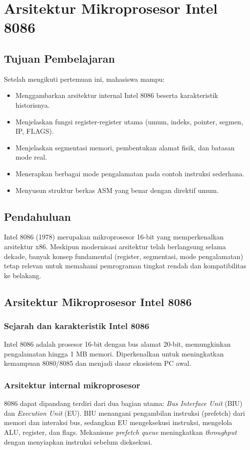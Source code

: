 \chapter{Arsitektur Mikroprosesor Intel 8086}

\section{Tujuan Pembelajaran}
Setelah mengikuti pertemuan ini, mahasiswa mampu:
\begin{itemize}
    \item Menggambarkan arsitektur internal Intel 8086 beserta karakteristik historisnya.
    \item Menjelaskan fungsi register-register utama (umum, indeks, pointer, segmen, IP, FLAGS).
    \item Menjelaskan segmentasi memori, pembentukan alamat fisik, dan batasan mode real.
    \item Menerapkan berbagai mode pengalamatan pada contoh instruksi sederhana.
    \item Menyusun struktur berkas ASM yang benar dengan direktif umum.
\end{itemize}

\section{Pendahuluan}
Intel 8086 (1978) merupakan mikroprosesor 16-bit yang memperkenalkan arsitektur x86. Meskipun modernisasi arsitektur telah berlangsung selama dekade, banyak konsep fundamental (register, segmentasi, mode pengalamatan) tetap relevan untuk memahami pemrograman tingkat rendah dan kompatibilitas ke belakang.

\section{Arsitektur Mikroprosesor Intel 8086}
\subsection{Sejarah dan karakteristik Intel 8086}
Intel 8086 adalah prosesor 16-bit dengan bus alamat 20-bit, memungkinkan pengalamatan hingga 1 MB memori. Diperkenalkan untuk meningkatkan kemampuan 8080/8085 dan menjadi dasar ekosistem PC awal.

\subsection{Arsitektur internal mikroprosesor}
8086 dapat dipandang terdiri dari dua bagian utama: \textit{Bus Interface Unit} (BIU) dan \textit{Execution Unit} (EU). BIU menangani pengambilan instruksi (prefetch) dari memori dan interaksi bus, sedangkan EU mengeksekusi instruksi, mengelola ALU, register, dan flags. Mekanisme \textit{prefetch queue} meningkatkan \textit{throughput} dengan menyiapkan instruksi sebelum dieksekusi.

